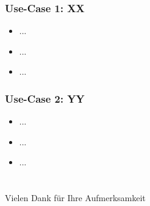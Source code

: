 \documentclass{beamer}
\begin{document}
\setcounter{subsection}{1}
\begin{frame}
  \frametitle{Use-Case 1: XX}
   \begin{itemize}
    \item{...}
    \item{...}
    \item{...}
   \end{itemize}
\end{frame}

\setcounter{subsection}{1}
\begin{frame}
  \frametitle{Use-Case 2: YY}
   \begin{itemize}
    \item{...}
    \item{...}
    \item{...}
   \end{itemize}
\end{frame}

\section{}
\begin{frame}
  Vielen Dank für Ihre Aufmerksamkeit
\end{frame}
\end{document}
